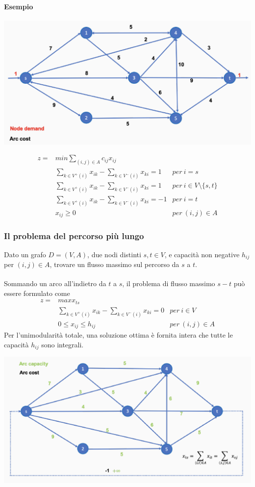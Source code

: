 \documentclass[12pt,a4paper]{article}
\begin{document}
\paragraph{Esempio}
\begin{center}
\includegraphics[width=0.5\columnwidth]{img/fcm2.png}
\end{center}
$$\begin{array}{rll}
z = & min \sum_{(i,j)\in A}c_{ij}x_{ij} &\\
& \sum_{k \in V^+(i)}x_{ik} - \sum_{k\in V^-(i)}x_{ki}=1 & per\ i=s\\
& \sum_{k \in V^+(i)}x_{ik} - \sum_{k\in V^-(i)}x_{ki}=1 & per\ i\in V \setminus \{s,t\}\\
& \sum_{k \in V^+(i)}x_{ik} - \sum_{k\in V^-(i)}x_{ki}=-1 & per\ i=t\\
& x_{ij} \geq 0 & per\ (i,j) \in A
\end{array}$$

\subsubsection{Il problema del percorso più lungo}
Dato un grafo $D = (V,A)$, due nodi distinti $s, t \in V$, e capacità non negative $h_{ij}$ per $(i, j) \in A$, trovare un flusso massimo sul percorso da $s$ a $t$.\\
\\
Sommando un arco all'indietro da $t$ a $s$, il problema di flusso massimo $s - t$ può essere formulato come
$$\begin{array}{rll}
z = & max x_{ts} &\\
& \sum_{k \in V^+(i)}x_{ik} - \sum_{k\in V^-(i)}x_{ki}=0 & per\ i\in V\\
& 0 \leq x_{ij} \leq h_{ij} & per\ (i,j) \in A
\end{array}$$
Per l'unimodularità totale, una soluzione ottima è fornita intera che tutte le capacità $h_{ij}$ sono integrali.
\begin{center}
\includegraphics[width=0.5\columnwidth]{img/fcmax.png}
\end{center}
\end{document}
